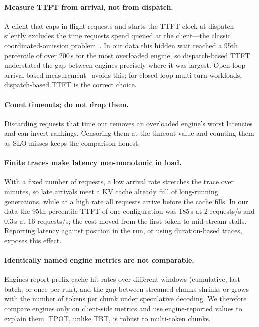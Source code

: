 \paragraph{Measure TTFT from arrival, not from dispatch.}
A client that caps in-flight requests and starts the TTFT clock at dispatch silently excludes
the time requests spend queued at the client---the classic coordinated-omission
problem~\cite{tene2015latency}. In our data this hidden wait reached a 95th percentile of over
200\,s for the most overloaded engine, so dispatch-based TTFT understated the gap between
engines precisely where it was largest. Open-loop arrival-based measurement~\cite{schroeder2006open}
avoids this; for closed-loop multi-turn workloads, dispatch-based TTFT is the correct choice.

\paragraph{Count timeouts; do not drop them.}
Discarding requests that time out removes an overloaded engine's worst latencies and can invert
rankings. Censoring them at the timeout value and counting them as SLO misses keeps the
comparison honest.

\paragraph{Finite traces make latency non-monotonic in load.}
With a fixed number of requests, a low arrival rate stretches the trace over minutes, so late
arrivals meet a KV cache already full of long-running generations, while at a high rate all
requests arrive before the cache fills. In our data the 95th-percentile TTFT of one
configuration was 185\,s at 2 requests/s and 0.3\,s at 16 requests/s; the cost moved from the
first token to mid-stream stalls. Reporting latency against position in the run, or using
duration-based traces, exposes this effect.

\paragraph{Identically named engine metrics are not comparable.}
Engines report prefix-cache hit rates over different windows (cumulative, last batch, or once
per run), and the gap between streamed chunks shrinks or grows with the number of tokens per
chunk under speculative decoding. We therefore compare engines only on client-side metrics and
use engine-reported values to explain them. TPOT, unlike TBT, is robust to multi-token chunks.

